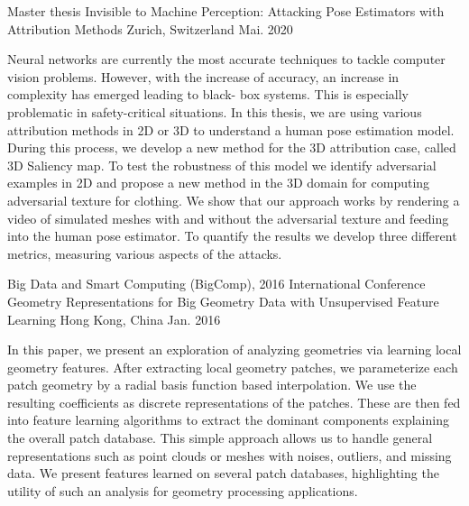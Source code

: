

\begin{cventries}

  \cventry
    {Master thesis} %
    {Invisible to Machine Perception: Attacking Pose Estimators with Attribution Methods} %
    {Zurich, Switzerland} %
    {Mai. 2020} %
    {
      \begin{cvitems} %
        \item {
          Neural networks are currently the most accurate techniques to tackle computer vision problems.
          However, with the increase of accuracy, an increase in complexity has emerged leading to black-
          box systems. This is especially problematic in safety-critical situations. In this thesis, we are
          using various attribution methods in 2D or 3D to understand a human pose estimation model.
          During this process, we develop a new method for the 3D attribution case, called 3D Saliency
          map.
          To test the robustness of this model we identify adversarial examples in 2D and propose a new
          method in the 3D domain for computing adversarial texture for clothing. We show that our
          approach works by rendering a video of simulated meshes with and without the adversarial
          texture and feeding into the human pose estimator. To quantify the results we develop three
          different metrics, measuring various aspects of the attacks.
        }
      \end{cvitems}
    }

  \cventry
    {Big Data and Smart Computing (BigComp), 2016 International Conference} %
    {Geometry Representations for Big Geometry Data with Unsupervised Feature Learning} %
    {Hong Kong, China } %
    {Jan. 2016} %
    {
      \begin{cvitems} %
        \item {
			In this paper, we present an exploration of analyzing geometries via learning local geometry features. After extracting local geometry patches, we parameterize each patch geometry by a radial basis function based interpolation. We use the resulting coefficients as discrete representations of the patches. These are then fed into feature learning algorithms to extract the dominant components explaining the overall patch database. This simple approach allows us to handle general representations such as point clouds or meshes with noises, outliers, and missing data. We present features learned on several patch databases, highlighting the utility of such an analysis for geometry processing applications.
        }
      \end{cvitems}
    }


\end{cventries}

